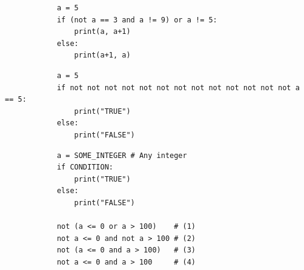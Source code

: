 \documentclass[dvipsnames, svgnames, x11names, handout]{beamer}
\begin{document}
\begin{frame}[fragile]{}
    \begin{center}
        \begin{verbatim}
            a = 5
            if (not a == 3 and a != 9) or a != 5:
                print(a, a+1)
            else:
                print(a+1, a)
        \end{verbatim}
    \end{center}
\end{frame}

\begin{frame}[fragile]{}
    \begin{center}
        \begin{verbatim}
            a = 5
            if not not not not not not not not not not not not not a == 5:
                print("TRUE")
            else:
                print("FALSE")
        \end{verbatim}
    \end{center}
\end{frame}

\begin{frame}[fragile]{}
    \begin{center}
        \begin{verbatim}
            a = SOME_INTEGER # Any integer
            if CONDITION:
                print("TRUE")
            else:
                print("FALSE")
            
            not (a <= 0 or a > 100)    # (1)
            not a <= 0 and not a > 100 # (2)
            not (a <= 0 and a > 100)   # (3)
            not a <= 0 and a > 100     # (4)
        \end{verbatim}
    \end{center}
\end{frame}
\end{document}
